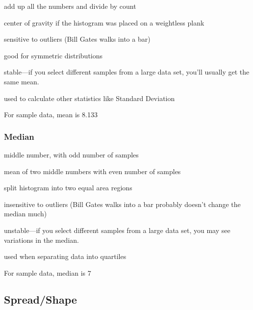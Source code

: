 \documentclass{exam}
\begin{document}
  \begin{itemize*}
    \item add up all the numbers and divide by count

    \item center of gravity if the histogram was placed on a weightless plank

    \item sensitive to outliers (Bill Gates walks into a bar)

    \item good for symmetric distributions

    \item stable---if you select different samples from a large data set, you'll usually
      get the same mean.

    \item used to calculate other statistics like Standard Deviation
  \end{itemize*}

  For sample data, mean is 8.133

  \subsubsection{Median}

  \begin{itemize*}
    \item middle number, with odd number of samples

    \item mean of two middle numbers with even number of samples

    \item split histogram into two equal area regions

    \item insensitive to outliers (Bill Gates walks into a bar probably doesn't change the
      median much)

    \item unstable---if you select different samples from a large data set, you may see
      variations in the median.

    \item used when separating data into quartiles
  \end{itemize*}

  For sample data, median is 7

  \subsection{Spread/Shape}
\end{document}
